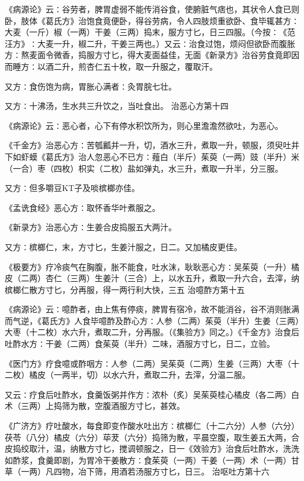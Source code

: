 \documentclass[a4paper,12pt,UTF8,twoside]{ctexbook}
\begin{document}
《病源论》云∶谷劳者，脾胃虚弱不能传消谷食，使腑脏气痞也，其状令人食已则卧，肢体《葛氏方》治饱食竟便卧，得谷劳病，令人四肢烦重欲卧、食毕辄甚方∶大麦（一斤）椒（一两）干姜（三两）捣末，服方寸匕，日三四服。（今按∶《范汪方》∶大麦一升，椒二升，干姜三两也。）又云∶治食过饱，烦闷但欲卧而腹胀方∶熬麦面令微香，捣服方寸匕，得大麦面益佳，无面《新录方》治谷劳食竟即因而睡方∶以酒二升，煎杏仁五十枚，取一升服之，覆取汗。

又方∶食伤饱为病，胃胀心满者∶灸胃脘七壮。

又方∶十沸汤，生水共三升饮之，当吐食出。
治恶心方第十四

《病源论》云∶恶心者，心下有停水积饮所为，则心里澹澹然欲吐，为恶心。

《千金方》治恶心方∶苦瓠瓤并一升，切，酒水三升，煮取一升，顿服，须臾吐并下如虾蟆《葛氏方》治人忽恶心不已方∶薤白（半斤）茱萸（一两）豉（半升）米（一合）枣（四枚）枳实（二枚）盐如弹丸，水三升，煮取一升半，分三服。

又方∶但多嚼豆KT子及啖槟榔亦佳。

《孟诜食经》恶心方∶取怀香华叶煮服之。

《新录方》治恶心方∶生姜合皮捣服五大两汁。

又方∶槟榔仁，末，方寸匕，生姜汁服之，日二。又加橘皮更佳。

《极要方》疗冷痰气在胸腹，胀不能食，吐水沫，耿耿恶心方∶吴茱萸（一升）橘皮（二两）杏仁（三两）生姜汁（三合）上，以水五升，煮取一升六合，去滓，纳槟榔仁散方寸匕，分再服，得一两行利大快，三五
治噫酢方第十五

《病源论》云∶噫酢者，由上焦有停痰，脾胃有宿冷，故不能消谷，谷不消则胀满而气逆，《葛氏方》人食毕噫酢及酢心方∶人参（二两）茱萸（半升）生姜（三两）大枣（十二枚）水六升，煮取二升，分再服。（《集验方》同之。）《千金方》治食后吐酢水方∶干姜（二两）食茱萸（半升）二味，酒服方寸匕，日二，立验。

《医门方》疗食噫或酢咽方∶人参（二两）吴茱萸（二两）生姜（三两）大枣（十二枚）橘皮（一两半，切）以水六升，煮取二升，去滓，分温二服。

又云∶疗食后吐酢水，食羹饭粥并作方∶浓朴（炙）吴茱萸桂心橘皮（各二两）白术（三两）上捣筛为散，空腹酒服方寸匕，甚效。

《广济方》疗吐酸水，每食即变作酸水吐出方∶槟榔仁（十二六分）人参（六分）茯苓（八分）橘皮（六分）荜茇（六分）捣筛为散，平晨空腹，取生姜五大两，合皮捣绞取汁，温，纳散方寸匕，搅调顿服之，日一《效验方》治食后吐酢水，洗洗如酢浆，食羹即剧，为胃冷干姜散方∶食茱萸（一两）干姜（一两）术（一两）甘草（一两）凡四物，冶下筛，用酒若汤服方寸匕，日三。
治呕吐方第十六
\end{document}
